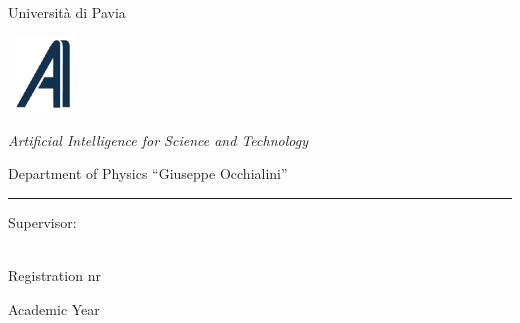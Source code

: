 \begin{titlepage}
\begin{center}
\begin{minipage}[t]{18cm}
\begin{center}
\begin{minipage}[t]{4cm}
\begin{center}
\Large Universit\`a %
di Pavia
\end{center}
\end{minipage}%
\end{center}%
\end{minipage}

\vskip 1.5cm

\begin{center}%
\begin{minipage}{2cm}%
\includegraphics[height=2cm,width=2cm]{logos/logo-ai4st}%
\end{minipage}%
\begin{minipage}{12cm}%
\begin{center}%
\LARGE%
\textit{Artificial Intelligence for Science and Technology}

Department of Physics ``Giuseppe Occhialini''

\end{center}%
\end{minipage}%
\end{center}%

\vskip 0.2cm
\hrule


\vskip 2.5cm

\Huge
	\textbf{\printtitle}

\vskip 4.5cm

\Large

\begin{minipage}[t]{9cm}
	Supervisor:
	\printsupervisor \\
\end{minipage}
\hfill
\begin{minipage}[t]{5cm}
	\printauthor\\
	Registration nr
    \regnumber
\end{minipage}

\vskip 1.5cm

	Academic Year \printacademicyear

\end{center}

\vfill
\eject
\end{titlepage}

\clearpage

\restoregeometry

